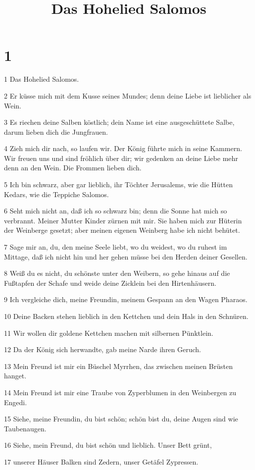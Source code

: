 

\title{Das Hohelied Salomos}


\chapter{1}

\par 1 Das Hohelied Salomos.
\par 2 Er küsse mich mit dem Kusse seines Mundes; denn deine Liebe ist lieblicher als Wein.
\par 3 Es riechen deine Salben köstlich; dein Name ist eine ausgeschüttete Salbe, darum lieben dich die Jungfrauen.
\par 4 Zieh mich dir nach, so laufen wir. Der König führte mich in seine Kammern. Wir freuen uns und sind fröhlich über dir; wir gedenken an deine Liebe mehr denn an den Wein. Die Frommen lieben dich.
\par 5 Ich bin schwarz, aber gar lieblich, ihr Töchter Jerusalems, wie die Hütten Kedars, wie die Teppiche Salomos.
\par 6 Seht mich nicht an, daß ich so schwarz bin; denn die Sonne hat mich so verbrannt. Meiner Mutter Kinder zürnen mit mir. Sie haben mich zur Hüterin der Weinberge gesetzt; aber meinen eigenen Weinberg habe ich nicht behütet.
\par 7 Sage mir an, du, den meine Seele liebt, wo du weidest, wo du ruhest im Mittage, daß ich nicht hin und her gehen müsse bei den Herden deiner Gesellen.
\par 8 Weiß du es nicht, du schönste unter den Weibern, so gehe hinaus auf die Fußtapfen der Schafe und weide deine Zicklein bei den Hirtenhäusern.
\par 9 Ich vergleiche dich, meine Freundin, meinem Gespann an den Wagen Pharaos.
\par 10 Deine Backen stehen lieblich in den Kettchen und dein Hals in den Schnüren.
\par 11 Wir wollen dir goldene Kettchen machen mit silbernen Pünktlein.
\par 12 Da der König sich herwandte, gab meine Narde ihren Geruch.
\par 13 Mein Freund ist mir ein Büschel Myrrhen, das zwischen meinen Brüsten hanget.
\par 14 Mein Freund ist mir eine Traube von Zyperblumen in den Weinbergen zu Engedi.
\par 15 Siehe, meine Freundin, du bist schön; schön bist du, deine Augen sind wie Taubenaugen.
\par 16 Siehe, mein Freund, du bist schön und lieblich. Unser Bett grünt,
\par 17 unserer Häuser Balken sind Zedern, unser Getäfel Zypressen.

